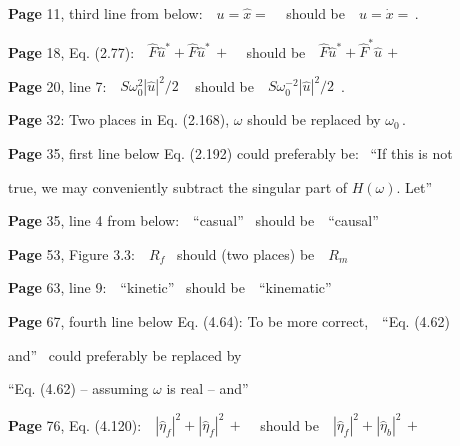 \documentclass[a4paper,12pt]{article}
\begin{document}
\noindent %
{\bf Page} 11, third line from below: \,\,  $u =\hat{x}=$ \,\,\, should be \,\, $u =\dot{x}=$\,. %
\vspace{0.2cm}

\noindent %
{\bf Page} 18, Eq. (2.77): \,\,  $\hat{F}\hat{u}^* + \hat{F}\hat{u}^* \, +$ \,\,\, should be \,\, 
$\hat{F}\hat{u}^* + \hat{F}^*\hat{u}\, +$ %
\vspace{0.2cm}

\noindent %
{\bf Page} 20, line 7: \,\,  $S\omega_0^{2} |\hat{u}|^2/2$ \,\,\, should be \,\, $S\omega_0^{-2} |\hat{u}|^2/2$\, . %
\vspace{0.2cm}

\noindent %
{\bf Page} 32: Two places in Eq. (2.168), $\omega$ should be replaced by $\omega_0$\,. %
\vspace{0.2cm}

\noindent %
{\bf Page} 35, first line below Eq. (2.192) could preferably be: \, ``If this is not 

true, we may conveniently subtract the singular part of $H(\omega)$. Let'' %
\vspace{0.2cm}

\noindent %
{\bf Page} 35, line 4 from below: \,\,  ``casual''\,\,\, should be \,\, ``causal'' %
\vspace{0.2cm}

\noindent %
{\bf Page} 53, Figure 3.3: \,\,  $R_f$\,\,\, should (two places) be \,\, $R_m$ %
\vspace{0.2cm}

\noindent %
{\bf Page} 63, line 9: \,\,  ``kinetic''\,\,\, should be \,\, ``kinematic'' %
\vspace{0.2cm}

\noindent %
{\bf Page} 67, fourth line below Eq. (4.64): To be more correct, \,\,  ``Eq. (4.62) 

and''\,\,\, could preferably be replaced by \,\, 

``Eq. (4.62) -- assuming $\omega$ is real -- and'' %
\vspace{0.2cm}

\noindent %
{\bf Page} 76, Eq. (4.120): \,\,  $|\hat{\eta}_f|^2  + |\hat{\eta}_f|^2 \, +$ \,\,\, should be \,\, 
$|\hat{\eta}_f|^2  + |\hat{\eta}_b|^2 \, +$ %
\vspace{0.2cm}
\end{document}
